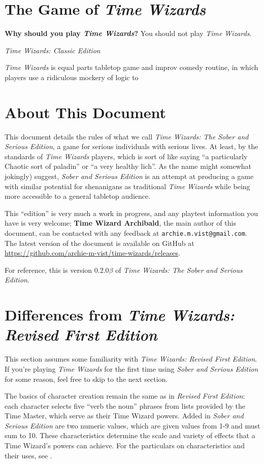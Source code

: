\documentclass{article}
\newcommand{\twsse}{\emph{Time Wizards: The Sober and Serious Edition}}
\newcommand{\tw}{\emph{Time Wizards}}
\newcommand{\sse}{\emph{Sober and Serious Edition}}
\newcommand{\rfe}{\emph{Revised First Edition}}
\newcommand{\vers}{$0.2.0 \beta$}
\newcommand{\namefag}[2][]{{\color{anongreen} \textbf{#2}#1}}
\begin{document}

\cleardoublepage

\setcounter{tocdepth}{2}
\tableofcontents
\cleardoublepage

\section{The Game of \tw{}} \label{sec:gameintro}
\epigraph{\textbf{Why should you play \tw{}?} You should not play \tw{}.}
   {\emph{Time Wizards: Classic Edition}}
\tw{} is equal parts tabletop game and improv comedy routine, in which players use a ridiculous
mockery of logic to 

\section{About This Document} \label{sec:rulesintro}
This document details the rules of what we call \twsse{}, a game for serious individuals
with serious lives. At least, by the standards of \tw{} players, which is sort of like saying
``a particularly Chaotic sort of paladin'' or ``a very healthy lich''. As the name might 
somewhat jokingly) suggest, \sse{} is an attempt at producing a game with similar potential for
shenanigans as traditional \tw{} while being more accessible to a general tabletop audience.

This ``edition'' is very much a work in progress, and any playtest information you have is very
welcome; \namefag{Time Wizard Archibald}, the main author of this document, can be contacted with
any feedback at \verb|archie.m.vist@gmail.com|. The latest version of the document is available
on GitHub at \url{https://github.com/archie-m-vist/time-wizards/releases}.

For reference, this is version \vers{} of \twsse. %

\section{Differences from \emph{Time Wizards: Revised First Edition}}
This section assumes some familiarity with \emph{Time Wizards: Revised First Edition}. If you're
playing \tw{} for the first time using \sse{} for some reason, feel free to skip to the next
section.

The basics of character creation remain the same as in \rfe{}: each character selects five ``verb
the noun'' phrases from lists provided by the Time Master, which serve as their Time Wizard
powers. Added in \sse{} are two numeric values, which are given values from 1-9 and must sum to
10. These characteristics determine the scale and variety of effects that a Time Wizard's powers
can achieve. For the particulars on characteristics and their uses, see
.
\end{document}
